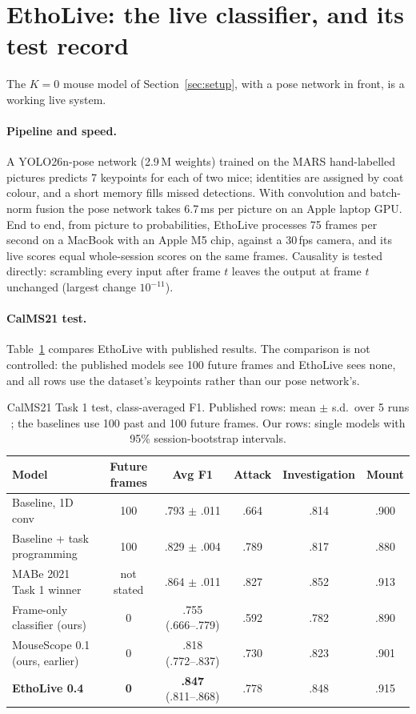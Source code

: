 \documentclass[10pt]{article}
\begin{document}
\section{EthoLive: the live classifier, and its test record}
\label{sec:etholive}

The $K=0$ mouse model of Section~\ref{sec:setup}, with a pose network in front, is a working live system.

\paragraph{Pipeline and speed.} A YOLO26n-pose network \citep{ultralytics} (2.9\,M weights) trained on the MARS hand-labelled pictures \citep{segalin2021mars} predicts 7 keypoints for each of two mice; identities are assigned by coat colour, and a short memory fills missed detections. With convolution and batch-norm fusion the pose network takes 6.7\,ms per picture on an Apple laptop GPU. End to end, from picture to probabilities, EthoLive processes 75 frames per second on a MacBook with an Apple M5 chip, against a 30\,fps camera, and its live scores equal whole-session scores on the same frames. Causality is tested directly: scrambling every input after frame $t$ leaves the output at frame $t$ unchanged (largest change $10^{-11}$).

\paragraph{CalMS21 test.} Table~\ref{tab:task1} compares EthoLive with published results. The comparison is not controlled: the published models see 100 future frames and EthoLive sees none, and all rows use the dataset's keypoints rather than our pose network's.

\begin{table}[t]
\centering
\caption{CalMS21 Task 1 test, class-averaged F1. Published rows: mean $\pm$ s.d.\ over 5 runs \citep{sun2021calms21}; the baselines use 100 past and 100 future frames. Our rows: single models with 95\% session-bootstrap intervals.}
\label{tab:task1}
\begin{tabular}{lccccc}
\toprule
Model & Future frames & Avg F1 & Attack & Investigation & Mount \\
\midrule
Baseline, 1D conv \citep{sun2021calms21} & 100 & .793 $\pm$ .011 & .664 & .814 & .900 \\
Baseline + task programming & 100 & .829 $\pm$ .004 & .789 & .817 & .880 \\
MABe 2021 Task 1 winner & not stated & .864 $\pm$ .011 & .827 & .852 & .913 \\
\midrule
Frame-only classifier (ours) & 0 & .755 (.666--.779) & .592 & .782 & .890 \\
MouseScope 0.1 (ours, earlier) & 0 & .818 (.772--.837) & .730 & .823 & .901 \\
\textbf{EthoLive 0.4} & \textbf{0} & \textbf{.847} (.811--.868) & .778 & .848 & .915 \\
\bottomrule
\end{tabular}
\end{table}
\end{document}
